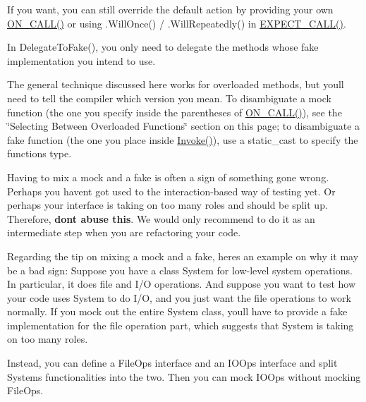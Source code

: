 \begin{DoxyItemize}
\item If you want, you can still override the default action by providing your own {\ttfamily \hyperlink{gmock-spec-builders_8h_a5b12ae6cf84f0a544ca811b380c37334}{O\+N\+\_\+\+C\+A\+L\+L()}} or using {\ttfamily .Will\+Once()} / {\ttfamily .Will\+Repeatedly()} in {\ttfamily \hyperlink{gmock-spec-builders_8h_a535a6156de72c1a2e25a127e38ee5232}{E\+X\+P\+E\+C\+T\+\_\+\+C\+A\+L\+L()}}.
\item In {\ttfamily Delegate\+To\+Fake()}, you only need to delegate the methods whose fake implementation you intend to use.
\item The general technique discussed here works for overloaded methods, but you\textquotesingle{}ll need to tell the compiler which version you mean. To disambiguate a mock function (the one you specify inside the parentheses of {\ttfamily \hyperlink{gmock-spec-builders_8h_a5b12ae6cf84f0a544ca811b380c37334}{O\+N\+\_\+\+C\+A\+L\+L()}}), see the \char`\"{}\+Selecting Between Overloaded Functions\char`\"{} section on this page; to disambiguate a fake function (the one you place inside {\ttfamily \hyperlink{namespacetesting_a12aebaf8363d49a383047529f798b694}{Invoke()}}), use a {\ttfamily static\+\_\+cast} to specify the function\textquotesingle{}s type.
\item Having to mix a mock and a fake is often a sign of something gone wrong. Perhaps you haven\textquotesingle{}t got used to the interaction-\/based way of testing yet. Or perhaps your interface is taking on too many roles and should be split up. Therefore, {\bfseries don\textquotesingle{}t abuse this}. We would only recommend to do it as an intermediate step when you are refactoring your code.
\end{DoxyItemize}

Regarding the tip on mixing a mock and a fake, here\textquotesingle{}s an example on why it may be a bad sign\+: Suppose you have a class {\ttfamily System} for low-\/level system operations. In particular, it does file and I/O operations. And suppose you want to test how your code uses {\ttfamily System} to do I/O, and you just want the file operations to work normally. If you mock out the entire {\ttfamily System} class, you\textquotesingle{}ll have to provide a fake implementation for the file operation part, which suggests that {\ttfamily System} is taking on too many roles.

Instead, you can define a {\ttfamily File\+Ops} interface and an {\ttfamily I\+O\+Ops} interface and split {\ttfamily System}\textquotesingle{}s functionalities into the two. Then you can mock {\ttfamily I\+O\+Ops} without mocking {\ttfamily File\+Ops}.

